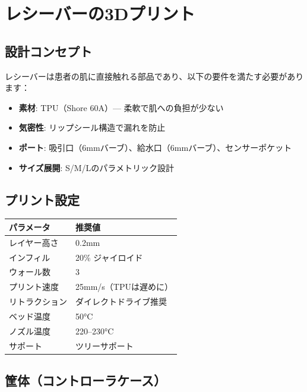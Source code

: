 \documentclass[a4paper,11pt]{article}
\begin{document}
\newpage
\section{レシーバーの3Dプリント}

\subsection{設計コンセプト}

レシーバーは患者の肌に直接触れる部品であり、以下の要件を満たす必要があります：

\begin{itemize}[leftmargin=2em]
  \item \textbf{素材}: TPU（Shore 60A）--- 柔軟で肌への負担が少ない
  \item \textbf{気密性}: リップシール構造で漏れを防止
  \item \textbf{ポート}: 吸引口（6mmバーブ）、給水口（6mmバーブ）、センサーポケット
  \item \textbf{サイズ展開}: S/M/Lのパラメトリック設計
\end{itemize}

\subsection{プリント設定}

\begin{longtable}{@{}ll@{}}
\toprule
\textbf{パラメータ} & \textbf{推奨値} \\
\midrule
レイヤー高さ & 0.2mm \\
インフィル & 20\% ジャイロイド \\
ウォール数 & 3 \\
プリント速度 & 25mm/s（TPUは遅めに） \\
リトラクション & ダイレクトドライブ推奨 \\
ベッド温度 & 50°C \\
ノズル温度 & 220--230°C \\
サポート & ツリーサポート \\
\bottomrule
\end{longtable}

\subsection{筐体（コントローラケース）}
\end{document}
